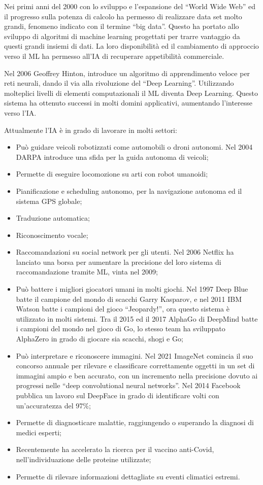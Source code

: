 \documentclass{article}
\numberwithin{equation}{subsection}
\begin{document}
Nei primi anni del 2000 con lo sviluppo e l'espansione del ``World Wide Web'' ed il progresso 
sulla potenza di calcolo ha permesso di realizzare data set molto grandi, fenomeno 
indicato con il termine ``big data''. Questo ha portato allo sviluppo di algoritmi di machine 
learning progettati per trarre vantaggio da questi grandi insiemi di dati. 
La loro disponibilità ed il cambiamento di approccio verso il ML ha permesso all'IA di 
recuperare appetibilità commerciale. 


Nel 2006 Geoffrey Hinton, introduce un algoritmo di apprendimento veloce per reti 
neurali, dando il via alla rivoluzione del ``Deep Learning''. Utilizzando molteplici livelli di 
elementi computazionali il ML diventa Deep Learning. Questo sistema ha ottenuto successi 
in molti domini applicativi, aumentando l'interesse 
verso l'IA. 

Attualmente l'IA è in grado di lavorare in molti settori:
\begin{itemize}
    \item Può guidare veicoli robotizzati come automobili o droni autonomi. Nel 2004 DARPA introduce una sfida per la guida autonoma di veicoli;
    \item Permette di eseguire locomozione su arti con robot umanoidi;
    \item Pianificazione e scheduling autonomo, per la navigazione autonoma ed il sistema GPS globale;
    \item Traduzione automatica;
    \item Riconoscimento vocale;
    \item Raccomandazioni su social network per gli utenti. Nel 2006 Netflix ha lanciato una borsa per aumentare la precisione del loro sistema di raccomandazione tramite ML, vinta nel 2009;
    \item Può battere i migliori giocatori umani in molti giochi. Nel 1997 Deep Blue batte il campione del mondo di scacchi Garry Kasparov, e nel 2011 IBM Watson batte i campioni del gioco ``Jeopardy!'', ora questo sistema è utilizzato in molti sistemi. Tra il 2015 ed il 2017 AlphaGo di DeepMind batte i campioni del mondo nel gioco di Go, lo stesso team ha sviluppato AlphaZero in grado di giocare sia scacchi, shogi e Go;
    \item Può interpretare e riconoscere immagini. Nel 2021 ImageNet comincia il suo concorso annuale per rilevare e classificare correttamente oggetti in un set di immagini ampio e ben accurato, con un incremento nella precisione dovuto ai progressi nelle ``deep convolutional neural networks''. Nel 2014 Facebook pubblica un lavoro sul DeepFace in grado di identificare volti con un'accuratezza del 97\%;
    \item Permette di diagnosticare malattie, raggiungendo o superando la diagnosi di medici esperti;
    \item Recentemente ha accelerato la ricerca per il vaccino anti-Covid, nell'individuazione delle proteine utilizzate;
    \item Permette di rilevare informazioni dettagliate su eventi climatici estremi. 
\end{itemize}
\end{document}
